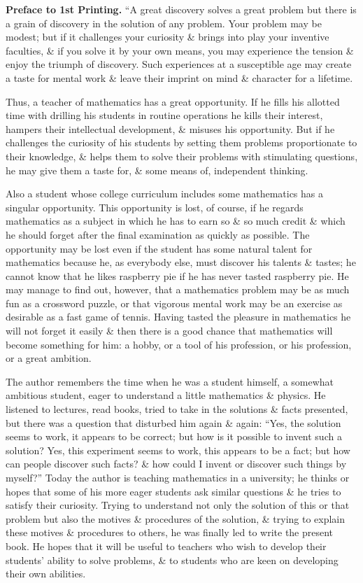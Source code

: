 \documentclass{article}
\begin{document}
\begin{enumerate}
	{\bf Preface to 1st Printing.} ``A great discovery solves a great problem but there is a grain of discovery in the solution of any problem. Your problem may be modest; but if it challenges your curiosity \& brings into play your inventive faculties, \& if you solve it by your own means, you may experience the tension \& enjoy the triumph of discovery. Such experiences at a susceptible age may create a taste for mental work \& leave their imprint on mind \& character for a lifetime.
	
	Thus, a teacher of mathematics has a great opportunity. If he fills his allotted time with drilling his students in routine operations he kills their interest, hampers their intellectual development, \& misuses his opportunity. But if he challenges the curiosity of his students by setting them problems proportionate to their knowledge, \& helps them to solve their problems with stimulating questions, he may give them a taste for, \& some means of, independent thinking.
	
	Also a student whose college curriculum includes some mathematics has a singular opportunity. This opportunity is lost, of course, if he regards mathematics as a subject in which he has to earn so \& so much credit \& which he should forget after the final examination as quickly as possible. The opportunity may be lost even if the student has some natural talent for mathematics because he, as everybody else, must discover his talents \& tastes; he cannot know that he likes raspberry pie if he has never tasted raspberry pie. He may manage to find out, however, that a mathematics problem may be as much fun as a crossword puzzle, or that vigorous mental work may be an exercise as desirable as a fast game of tennis. Having tasted the pleasure in mathematics he will not forget it easily \& then there is a good chance that mathematics will become something for him: a hobby, or a tool of his profession, or his profession, or a great ambition.
	
	The author remembers the time when he was a student himself, a somewhat ambitious student, eager to understand a little mathematics \& physics. He listened to lectures, read books, tried to take in the solutions \& facts presented, but there was a question that disturbed him again \& again: ``Yes, the solution seems to work, it appears to be correct; but how is it possible to invent such a solution? Yes, this experiment seems to work, this appears to be a fact; but how can people discover such facts? \& how could I invent or discover such things by myself?'' Today the author is teaching mathematics in a university; he thinks or hopes that some of his more eager students ask similar questions \& he tries to satisfy their curiosity. Trying to understand not only the solution of  this or that problem but also the motives \& procedures of the solution, \& trying to explain these motives \& procedures to others, he was finally led to write the present book. He hopes that it will be useful to teachers who wish to develop their students' ability to solve problems, \& to students who are keen on developing their own abilities.
	

\end{enumerate}
\end{document}
